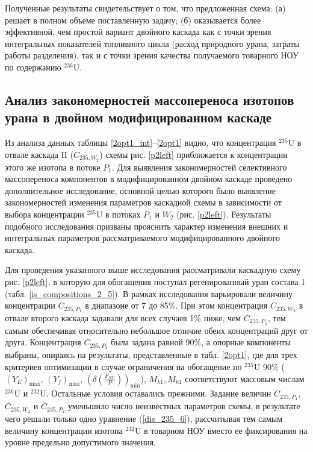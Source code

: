 Полученные результаты свидетельствует о том, что предложенная схема: (а) решает в полном объеме поставленную задачу; (б) оказывается более эффективной, чем простой вариант двойного каскада как с точки зрения интегральных показателей топливного цикла (расход природного урана, затраты работы разделения), так и с точки зрения качества получаемого товарного НОУ по содержанию $^{236}$U.

\subsection{Анализ закономерностей массопереноса изотопов урана в двойном модифицированном каскаде}

Из анализа данных таблицы \ref{2opt1_int}--\ref{2opt1} видно, что концентрация $^{235}$U в отвале каскада II ($C_{235,{W_2}}$) схемы рис. \ref{p2left} приближается к концентрации этого же изотопа в потоке $P_1$. Для выявления закономерностей селективного массопереноса компонентов в модифицированном двойном каскаде  проведено дополнительное исследование, основной целью которого было выявление закономерностей изменения параметров каскадной схемы в зависимости от выбора концентрации $^{235}$U в потоках $P_1$ и $W_2$ (рис. \ref{p2left}). Результаты подобного исследования призваны прояснить характер изменения внешних и интегральных параметров рассматриваемого модифицированного двойного каскада.

Для проведения указанного выше исследования рассматривали каскадную схему рис. \ref{p2left}, в которую для обогащения поступал регенированный уран состава 1 (табл. \ref{is_compositions_2_5}). В рамках исследования варьировали величину концентрации $C_{235,{P_1}}$ в диапазоне от 7 до 85\%. При этом концентрация $C_{235,{W_2}}$ в отвале второго каскада задавали для всех случаев 1\% ниже, чем $C_{235,{P_1}}$, тем самым обеспечивая относительно небольшое отличие обеих концентраций друг от друга. Концентрация $C_{235,{P_2}}$ была задана равной 90\%, а опорные компоненты выбраны, опираясь на результаты, представленные в табл. \ref{2opt1}, где для трех критериев оптимизации в случае ограничения на обогащение по $^{235}$U 90\% ($(Y_{E})_\text{max}$, $(Y_f)_\text{max}$, $(\delta(\frac{F_{NU}}{P}))_\text{min}$), $M_{k1}, M_{k1}$ соответствуют массовым числам $^{236}$U и $^{232}$U. Остальные условия оставались прежними.  
Задание величин $C_{235,{P_1}}$, $C_{235,{W_2}}$ и $C_{235,{P_2}}$ уменьшило число неизвестных параметров схемы, в результате чего решали только одно уравнение (\ref{dis_235_6}), рассчитывая тем самым величину концентрации изотопа $^{232}$U в товарном НОУ вместо ее фиксирования на уровне предельно допустимого значения.    


